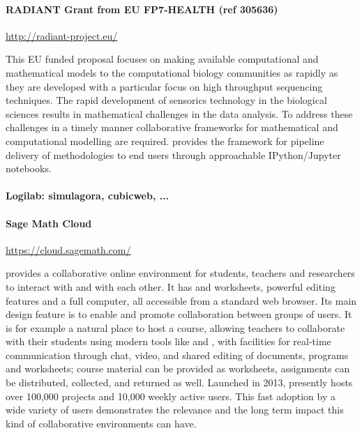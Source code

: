 \paragraph{RADIANT Grant from EU FP7-HEALTH (ref 305636)}
\url{http://radiant-project.eu/}

This EU funded proposal focuses on making available computational and
mathematical models to the computational biology communities as
rapidly as they are developed with a particular focus on high
throughput sequencing techniques. The rapid development of sensorics
technology in the biological sciences results in mathematical
challenges in the data analysis. To address these challenges in a
timely manner collaborative frameworks for mathematical and
computational modelling are required. \TheProject provides the
framework for pipeline delivery of methodologies to end users through
approachable IPython/Jupyter notebooks.


\paragraph{Logilab: simulagora, cubicweb, ...}


\paragraph{Sage Math Cloud} \url{https://cloud.sagemath.com/}

\SMC provides a collaborative online environment for students,
teachers and researchers to interact with \Sage and with each
other. It has \Sage and \IPython worksheets, powerful \LATEX editing
features and a full \Linux computer, all accessible from a standard
web browser. Its main design feature is to enable and promote
collaboration between groups of users. It is for example a natural
place to host a course, allowing teachers to collaborate with their
students using modern tools like \Sage and \LATEX, with facilities for
real-time communication through chat, video, and shared editing of
documents, programs and worksheets; course material can be provided as
worksheets, assignments can be distributed, collected, and returned as
well. Launched in 2013, \SMC presently hosts over 100,000 projects and
10,000 weekly active users. This fast adoption by a wide variety of
users demonstrates the relevance and the long term impact this kind of
collaborative environments can have.

